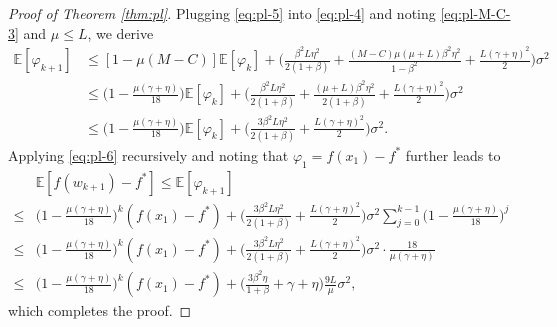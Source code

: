 \documentclass[10pt,a4paper]{amsart}
\newcommand{\ebb}{\mathbb{E}}  %
\begin{document}
\begin{proof}[Proof of Theorem \ref{thm:pl}]
Plugging \eqref{eq:pl-5} into \eqref{eq:pl-4} and noting \eqref{eq:pl-M-C-3} and $\mu\leq L$, we derive
\begin{equation}\label{eq:pl-6}
\begin{aligned}
\ebb[\varphi_{k+1}] & \leq[1-\mu(M-C)] \ebb[\varphi_k]+\Big(\frac{\beta^2 L \eta^2}{2(1+\beta)}+\frac{(M-C) \mu(\mu+L) \beta^2 \eta^2}{1-\beta^2}+\frac{L(\gamma+\eta)^2}{2}\Big) \sigma^2 \\
& \leq\Big(1-\frac{\mu(\gamma+\eta)}{18}\Big) \ebb[\varphi_k]+\Big(\frac{\beta^2 L \eta^2}{2(1+\beta)}+\frac{(\mu+L) \beta^2 \eta^2}{2(1+\beta)}+\frac{L(\gamma+\eta)^2}{2}\Big) \sigma^2 \\
& \leq\Big(1-\frac{\mu(\gamma+\eta)}{18}\Big) \ebb[\varphi_k]+\Big(\frac{3 \beta^2 L \eta^2}{2(1+\beta)}+\frac{L(\gamma+\eta)^2}{2}\Big) \sigma^2.
\end{aligned}
\end{equation}
Applying \eqref{eq:pl-6} recursively and noting that $\varphi_1=f(x_1)-f^*$ further leads to
\begin{equation*}
\begin{aligned}
&\ebb[f(w_{k+1})-f^*]\leq\ebb[\varphi_{k+1}]\\
\leq & \Big(1-\frac{\mu(\gamma+\eta)}{18}\Big)^k(f(x_1)-f^*)+\Big(\frac{3 \beta^2 L \eta^2}{2(1+\beta)}+\frac{L(\gamma+\eta)^2}{2}\Big) \sigma^2 \sum_{j=0}^{k-1}\Big(1-\frac{\mu(\gamma+\eta)}{18}\Big)^j \\
\leq & \Big(1-\frac{\mu(\gamma+\eta)}{18}\Big)^k(f(x_1)-f^*)+\Big(\frac{3 \beta^2 L \eta^2}{2(1+\beta)}+\frac{L(\gamma+\eta)^2}{2}\Big) \sigma^2 \cdot \frac{18}{\mu(\gamma+\eta)} \\
\leq & \Big(1-\frac{\mu(\gamma+\eta)}{18}\Big)^k(f(x_1)-f^*)+\Big(\frac{3 \beta^2 \eta}{1+\beta}+\gamma+\eta\Big) \frac{9L}{\mu} \sigma^2,
\end{aligned}
\end{equation*}
which completes the proof.
\end{proof}
\end{document}
